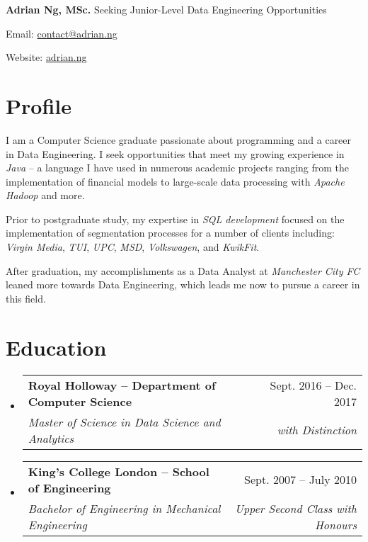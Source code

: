 \documentclass[letterpaper,11pt]{article}
\makeatletter
\newcommand{\resumeSubheading}[4]{
	\vspace{-1pt}\item
	\begin{tabular*}{0.97\textwidth}{l@{\extracolsep{\fill}}r}
		\textbf{#1} & #2 \\
		\textit{\small#3} & \textit{\small #4} \\
	\end{tabular*}\vspace{-5pt}
}
\newcommand{\resumeSubHeadingListStart}{\begin{itemize}[leftmargin=*]}
\newcommand{\resumeSubHeadingListEnd}{\end{itemize}}
\makeatother
\begin{document}
\noindent
\Large \textbf{Adrian Ng, MSc.}
\newline
\small
Seeking Junior-Level Data Engineering Opportunities
\hfill
\begin{description*}
	\item [Email:] \href{mailto:contact@adrian.ng}{contact@adrian.ng}
	\item [Website:] \href{https://adrian.ng}{adrian.ng}
\end{description*}
\section{Profile}
\begin{paragraph}
	I am a Computer Science graduate passionate about programming and a career in Data Engineering. I seek opportunities that meet my growing experience in \textit{Java} -- a language I have used in numerous academic projects ranging from the implementation of financial models to large-scale data processing with \textit{Apache Hadoop} and more.
	\par
	Prior to postgraduate study, my expertise in \textit{SQL development} focused on the implementation of segmentation processes for a number of clients including: \textit{Virgin Media}, \textit{TUI}, \textit{UPC}, \textit{MSD}, \textit{Volkswagen}, and \textit{KwikFit}.
	\par
	After graduation, my accomplishments as a Data Analyst at \textit{Manchester City FC} leaned more towards Data Engineering, which leads me now to pursue a career in this field.
\end{paragraph}
\section{Education}
\resumeSubHeadingListStart

\resumeSubheading
{Royal Holloway -- Department of Computer Science}{Sept. 2016 -- Dec. 2017}
{Master of Science in Data Science and Analytics}{with Distinction}

\resumeSubheading
{King's College London -- School of Engineering}{Sept. 2007 -- July 2010}
{Bachelor of Engineering in Mechanical Engineering}{Upper Second Class with Honours}

\resumeSubHeadingListEnd
\end{document}
